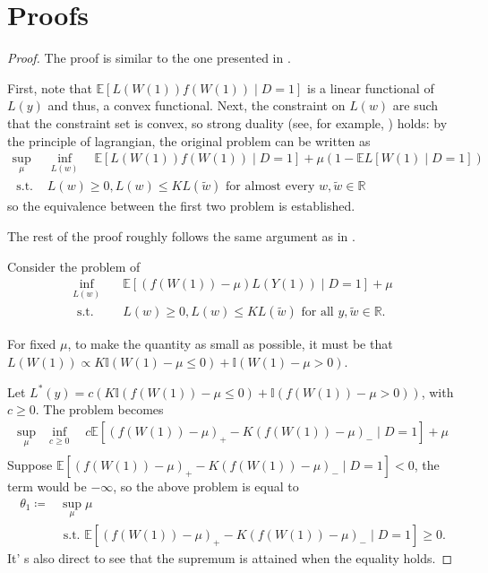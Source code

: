 \documentclass[12pt]{article}
\newcommand{\Indc}{\mathbb{I}}
\begin{document}
	\section{Proofs}

	
	\duality*
	
	\begin{proof}
		The proof is similar to the one presented in \textcite{yadlowsky2018bounds}. 
		
		First, note that $\mathbb{E}[L(W(1))f(W(1)) \mid D=1]$ is a linear functional of $L(y)$ and thus, a convex functional. Next, the constraint on $L(w)$ are such that the constraint set is convex, so strong duality (see, for example, \textcite{luenberger1997optimization}) holds: by the principle of lagrangian, the original problem can be written as
		$$
		\begin{array}{ll}
		\sup_{\mu} & \inf _{L(w)} \quad \mathbb{E}[L(W(1))f(W(1)) \mid D=1] + \mu(1 -  \mathbb{E}L[W(1)\mid D = 1]) \\
		\text { s.t. }  & L(w) \geq 0, L(w) \leq K L(\tilde{w}) \text { for almost every } w, \tilde{w} \in \mathbb{R}
		\end{array}
		$$
		so the equivalence between the first two problem is established.
		
		The rest of the proof roughly follows the same argument as in \textcite{yadlowsky2018bounds}.
		
		Consider the problem of 
		$$
		\begin{array}{ll}
		\inf _{L(w)} & \quad \mathbb{E}[(f(W(1))-\mu) L(Y(1)) \mid D=1]+\mu \\
		\text { s.t. } &\quad L(w) \geq 0, L(w) \leq K L(\tilde{w}) \text { for all } y, \tilde{w} \in \mathbb{R}.
		\end{array}
		$$
		
		For fixed $\mu$, to make the quantity as small as possible, it must be that $L(W(1)) \propto K \Indc(W(1) - \mu \leq 0) + \Indc(W(1) - \mu > 0)$.
		
		Let $L^*(y) = c(K \Indc(f(W(1)) - \mu \leq 0) + \Indc(f(W(1)) - \mu > 0))$, with $c \geq 0$. The problem becomes
		$$
		\begin{array}{ll}
		\sup_{\mu} & \inf _{c \geq 0} \quad c\mathbb{E}\left[(f(W(1))-\mu)_{+}-K(f(W(1))-\mu)_{-} \mid D=1\right] + \mu \\
		\end{array}
		$$
		Suppose $\mathbb{E}\left[(f(W(1))-\mu)_{+}-K(f(W(1))-\mu)_{-} \mid D=1\right] < 0$, the term would be $-\infty$, so the above problem is equal to 
		\begin{equation*}
		\begin{array}{ll}
		\theta_1 \coloneqq & \sup _{\mu}  \mu \\
		& \text { s.t. }  \mathbb{E}\left[(f(W(1))-\mu)_{+}-K(f(W(1))-\mu)_{-} \mid D=1\right] \geq 0.
		\end{array}
		\end{equation*}
		It' s also direct to see that the supremum is attained when the equality holds.
	\end{proof}
\end{document}
